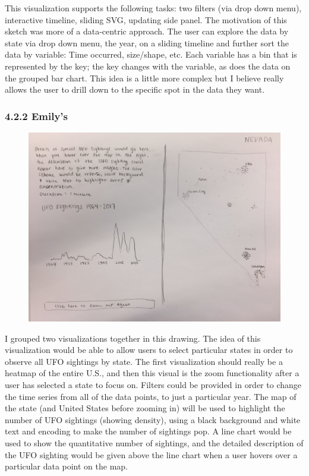 \documentclass{neu_handout}
\begin{document}
This visualization supports the following tasks: two filters (via drop down menu), interactive timeline, sliding SVG, updating ​side panel. The motivation of this sketch was more of a data-centric approach. The user can explore the data by state via drop down menu, the year, on a sliding timeline and further sort the data by variable: Time occurred, size/shape, etc. Each variable has a bin that is represented by the key; the key changes with the variable, as does the data on the grouped bar chart. This idea is a little more complex but I believe really allows the user to drill down to the specific spot in the data they want.

\newpage

\subsubsection*{4.2.2 Emily's}

\begin{figure}[h]
\centering
{
\includegraphics[width=0.9\linewidth]{emily1}
}
\end{figure}

I grouped two visualizations together in this drawing. The idea of this visualization would be able to allow users to select particular states in order to observe all UFO sightings by state. The first visualization should really be a heatmap of the entire U.S., and then this visual is the zoom functionality after a user has selected a state to focus on. Filters could be provided in order to change the time series from all of the data points, to just a particular year. The map of the state (and United States before zooming in) will be used to highlight the number of UFO sightings (showing density), using a black background and white text and encoding to make the number of sightings pop. A line chart would be used to show the quantitative number of sightings, and the detailed description of the UFO sighting would be given above the line chart when a user hovers over a particular data point on the map.\\\\
\end{document}
